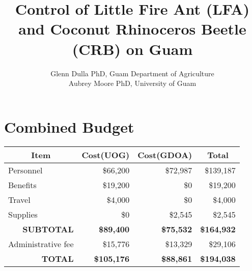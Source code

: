 \documentclass[12pt,letterpaper,english,bibliography=totocnumbered, abstract=on]{scrartcl}
\begin{document}
\titlehead{Grant Proposal: USDA Forest Service FY2020}

\title{Control of Little Fire Ant (LFA) and Coconut Rhinoceros Beetle (CRB) on Guam}

\author{Glenn Dulla PhD, Guam Department of Agriculture\\
	Aubrey Moore PhD, University of Guam}


\maketitle
\newpage
\tableofcontents

\pagebreak

\section{Combined Budget}

\begin{table}[h]
	\centering
	\begin{tabular}{@{}lrrr@{}}
		\toprule
		\multicolumn{1}{c}{\textbf{Item}} & \multicolumn{1}{c}{\textbf{Cost(UOG)}} & \multicolumn{1}{c}{\textbf{Cost(GDOA)}} & \multicolumn{1}{c}{\textbf{Total}} \\ \midrule
		Personnel & \$66,200 & \$72,987 & \$139,187 \\
		Benefits & \$19,200 & \$0 & \$19,200 \\
		Travel & \$4,000 & \$0 & \$4,000 \\
		Supplies & \$0 & \$2,545 & \$2,545 \\ \midrule
		\multicolumn{1}{r}{\textbf{SUBTOTAL}} & \textbf{\$89,400} & \textbf{\$75,532} & \textbf{\$164,932} \\ \midrule
		Administrative fee & \$15,776 & \$13,329 & \$29,106 \\ \midrule
		\multicolumn{1}{r}{\textbf{TOTAL}} & \textbf{\$105,176} & \textbf{\$88,861} & \textbf{\$194,038} \\ \bottomrule
	\end{tabular}
\end{table}
\end{document}
